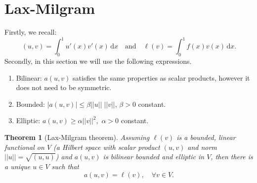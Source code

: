 \documentclass[12pt, a4paper]{article}
\newcommand{\rd}{\ensuremath{\mathrm{d}}}
\newcommand{\id}{\ensuremath{\,\rd}}
\newtheorem{theorem}{Theorem}[section]
\numberwithin{equation}{section}
\begin{document}
\section{Lax-Milgram}
Firstly, we recall:
\begin{equation*}
(u,v) = \int_0^1 u'(x)v'(x)\id x \quad \text{and}\quad \ell(v) = \int_0^1 f(x)v(x)\id x.
\end{equation*}
Secondly, in this section we will use the following expressions.
\begin{enumerate}
\item Bilinear: $a(u,v)$ satisfies the same properties as scalar products, however it does not need to be symmetric.
\item Bounded: $|a(u,v)| \leq \beta ||u|| \; ||v||$, $\beta>0$ constant.
\item Elliptic: $a(u,v) \geq \alpha ||v||^2,$ $\alpha>0$ constant.
\end{enumerate}
\begin{theorem}[Lax-Milgram theorem]
Assuming $\ell(v)$ is a bounded, linear functional on $V$ (a Hilbert space with scalar product $(u,v)$ and norm $||u||=\sqrt{(u,u)}$) and $a(u,v)$ is bilinear bounded and elliptic in $V$, then there is a unique $u\in V$ such that
\begin{equation*}
a(u,v) = \ell(v), \quad \forall v \in V.
\end{equation*}
\end{theorem}
\end{document}
